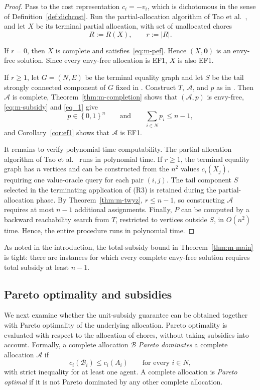 \documentclass[sigconf,anonymous]{aamas}
\newcommand{\agents}{N}
\newcommand{\alloc}{\mathcal{A}}
\newcommand{\allocB}{\mathcal{B}}
\newcommand{\bundle}[1]{A_{#1}}
\newcommand{\subsidy}{p}
\newcommand{\cost}{c}
\newcommand{\set}[1]{\left\{#1\right\}}
\newcommand{\abs}[1]{\left\lvert#1\right\rvert}
\theoremstyle{acmplain}
\theoremstyle{acmdefinition}
\theoremstyle{acmplain}
\begin{document}
\begin{proof}
Pass to the cost representation $\cost_i=-v_i$, which is dichotomous in the sense of Definition~\ref{def:dichcost}. Run the partial-allocation algorithm of Tao et al.~\cite{tao2025existence}, and let $X$ be its terminal partial allocation, with set of unallocated chores
\[ R:=R(X), \qquad r:=\abs R.
\]

If $r=0$, then $X$ is complete and satisfies~\eqref{eq:m-pef}. Hence $(X,\mathbf 0)$ is an envy-free solution. Since every envy-free allocation is EF1, $X$ is also EF1.

If $r\geq 1$, let $G=(\agents,E)$ be the terminal equality graph and let $S$ be the tail strongly connected component of $G$ fixed in . Construct $T$, $\alloc$, and $\subsidy$ as in . Then $\alloc$ is complete, Theorem~\ref{thm:m-completion} shows that $(\alloc,\subsidy)$ is envy-free, \eqref{eq:m-subsidy} and \eqref{eq_1} give \[
    \subsidy\in\set{0,1}^n
    \qquad\text{and}\qquad
    \sum_{i\in\agents}\subsidy_i\leq n-1,
\] and Corollary~\ref{cor:ef1} shows that $\alloc$ is EF1.

It remains to verify polynomial-time computability. The partial-allocation algorithm of Tao et al.~\cite{tao2025existence} runs in polynomial time. If $r\geq1$, the terminal equality graph has $n$ vertices and can be constructed from the $n^2$ values $c_i(X_j)$, requiring one value-oracle query for each pair $(i,j)$. The tail component $S$ selected in the terminating application of \textnormal{(R3)} is retained during the partial-allocation phase. By Theorem~\ref{thm:m-twyz}, $r\leq n-1$, so constructing $\alloc$ requires at most $n-1$ additional assignments. Finally, $P$ can be computed by a backward reachability search from $T$, restricted to vertices outside $S$, in $O(n^2)$ time. Hence, the entire procedure runs in polynomial time. \end{proof}

As noted in the introduction, the total-subsidy bound in Theorem~\ref{thm:m-main} is tight: there are instances for which every complete envy-free solution requires total subsidy at least \(n-1\).



\subsection{Pareto optimality and subsidies}
We next examine whether the unit-subsidy guarantee can be obtained together with Pareto optimality of the underlying allocation. Pareto optimality is evaluated with respect to the allocation of chores, without taking subsidies into account. Formally, a complete allocation $\allocB$ \emph{Pareto dominates} a complete allocation $\alloc$ if
\[\cost_i(\allocB_i)\leq \cost_i(\bundle i)
    \qquad\text{for every }i\in\agents,
\]
with strict inequality for at least one agent. A complete allocation is \emph{Pareto optimal} if it is not Pareto dominated by any other complete allocation.
\end{document}
